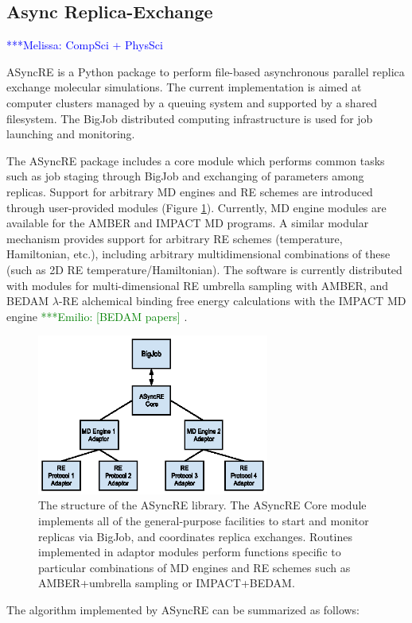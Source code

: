 \documentclass{sig-alternate}
\newcommand{\mrnote}[1]{ {\textcolor{blue} { ***Melissa: #1 }}}
\newcommand{\egnote}[1]{ {\textcolor{green} { ***Emilio: #1 }}}
\begin{document}
\subsection{Async Replica-Exchange}
\mrnote{CompSci + PhysSci}

ASyncRE is a Python package to perform file-based asynchronous
parallel replica exchange molecular simulations. The current
implementation is aimed at computer clusters managed by a queuing
system and supported by a shared filesystem. The BigJob distributed
computing infrastructure is used for job launching and monitoring.

The ASyncRE package includes a core module which performs common tasks
such as job staging through BigJob and exchanging of parameters among
replicas. Support for arbitrary MD engines and RE schemes are
introduced through user-provided modules (Figure \ref{fig:aRE_chart}). Currently, MD
engine modules are available for the AMBER and IMPACT MD programs. A
similar modular mechanism provides support for arbitrary RE schemes
(temperature, Hamiltonian, etc.), including arbitrary multidimensional
combinations of these (such as 2D RE temperature/Hamiltonian). The
software is currently distributed with modules for multi-dimensional RE
umbrella sampling with AMBER\cite{AMBER12}, and BEDAM $\lambda$-RE alchemical binding
free energy calculations with the IMPACT MD engine \egnote{[BEDAM papers]}.

\begin{figure}
\includegraphics[width=3in]{asyncre.eps}
\caption{\label{fig:aRE_chart}The structure of the ASyncRE
  library. The ASyncRE Core module implements all of the
  general-purpose facilities to start and monitor replicas via BigJob,
  and coordinates replica exchanges. Routines implemented in adaptor
  modules perform functions specific to particular combinations of MD
  engines and RE schemes such as AMBER+umbrella sampling or IMPACT+BEDAM.  }
\end{figure}


The algorithm implemented by ASyncRE can be summarized as follows:
\end{document}
